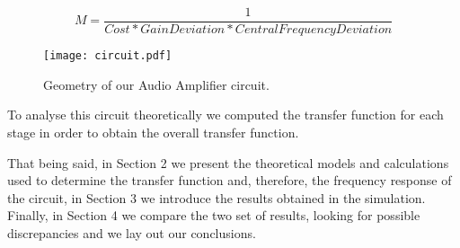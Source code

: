 \begin{equation}
\label{eqn:merit}
M=\frac{1}{Cost*Gain Deviation*Central Frequency Deviation}
\end{equation}

\begin{figure}[h] \centering
\texttt{[image: circuit.pdf]}
\caption{Geometry of our Audio Amplifier circuit.}
\end{figure}

To analyse this circuit theoretically we computed the transfer function for each stage in order to obtain the overall transfer function.

That being said, in Section 2 we present the theoretical models and calculations used to determine the transfer function and, therefore, the frequency response of the circuit, in Section 3 we introduce the results obtained in the simulation. Finally, in Section 4 we compare the two set of results, looking for possible discrepancies and we lay out our conclusions.



